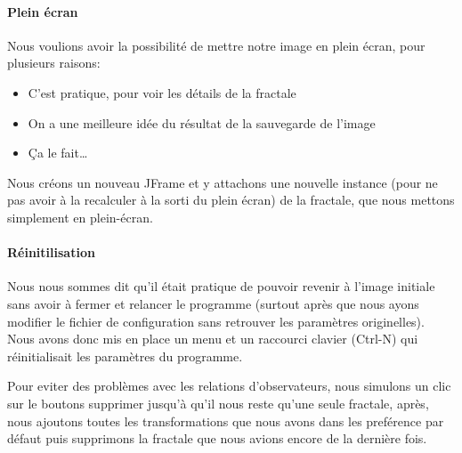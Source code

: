 \documentclass[a4paper]{article}
\begin{document}
\paragraph*{Plein écran}
Nous voulions avoir la possibilité de mettre notre image en plein écran, pour plusieurs raisons:
\begin{itemize}
\item C'est pratique, pour voir les détails de la fractale
\item On a une meilleure idée du résultat de la sauvegarde de l'image
\item Ça le fait\ldots
\end{itemize}

Nous créons un nouveau JFrame et y attachons une nouvelle instance (pour ne pas avoir à la recalculer à la sorti du plein écran) de la fractale, que nous mettons simplement en plein-écran.

\paragraph*{Réinitilisation}
Nous nous sommes dit qu'il était pratique de pouvoir revenir à l'image initiale sans avoir à fermer et relancer le programme (surtout après que nous ayons modifier le fichier de configuration sans retrouver les paramètres originelles). Nous avons donc mis en place un menu et un raccourci clavier (Ctrl-N) qui réinitialisait les paramètres du programme.

Pour eviter des problèmes avec les relations d'observateurs, nous simulons un clic sur le boutons supprimer jusqu'à qu'il nous reste qu'une seule fractale, après, nous ajoutons toutes les transformations que nous avons dans les preférence par défaut puis supprimons la fractale que nous avions encore de la dernière fois.
\end{document}
